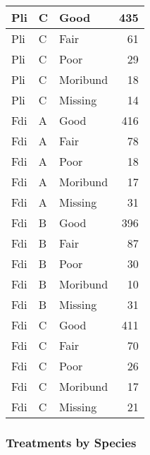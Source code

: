 \documentclass[
]{article}
\begin{document}
\begin{tabular}{l|l|l|r}
\hline
Pli & C & Good & 435\\
\hline
Pli & C & Fair & 61\\
\hline
Pli & C & Poor & 29\\
\hline
Pli & C & Moribund & 18\\
\hline
Pli & C & Missing & 14\\
\hline
Fdi & A & Good & 416\\
\hline
Fdi & A & Fair & 78\\
\hline
Fdi & A & Poor & 18\\
\hline
Fdi & A & Moribund & 17\\
\hline
Fdi & A & Missing & 31\\
\hline
Fdi & B & Good & 396\\
\hline
Fdi & B & Fair & 87\\
\hline
Fdi & B & Poor & 30\\
\hline
Fdi & B & Moribund & 10\\
\hline
Fdi & B & Missing & 31\\
\hline
Fdi & C & Good & 411\\
\hline
Fdi & C & Fair & 70\\
\hline
Fdi & C & Poor & 26\\
\hline
Fdi & C & Moribund & 17\\
\hline
Fdi & C & Missing & 21\\
\hline
\end{tabular}

\hypertarget{section-19}{%
\subsubsection{}\label{section-19}}

\hypertarget{treatments-by-species}{%
\subsubsection{Treatments by Species}\label{treatments-by-species}}
\end{document}

